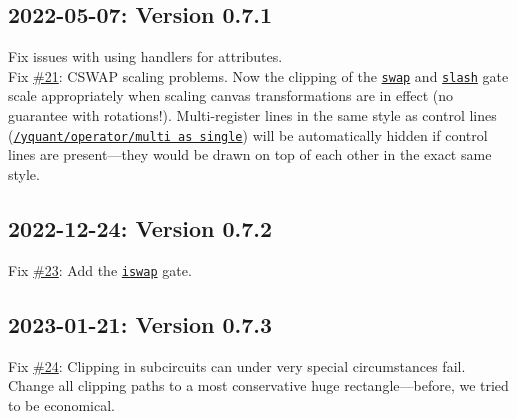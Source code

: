\documentclass{scrartcl}
\def\gate#1{\hyperref[gate:#1]{\texttt{#1}}}
\def\style#1{\hyperref[style:#1]{\texttt{#1}}}
\begin{document}
      \subsection*{2022-05-07: Version 0.7.1}
         Fix issues with using handlers for attributes. \\
         Fix \href{https://github.com/projekter/yquant/issues/21}{\#21}: CSWAP scaling problems. Now the clipping of the \gate{swap} and \gate{slash} gate scale appropriately when scaling canvas transformations are in effect (no guarantee with rotations!). Multi-register lines in the same style as control lines (\style{/yquant/operator/multi as single}) will be automatically hidden if control lines are present---they would be drawn on top of each other in the exact same style.

      \subsection*{2022-12-24: Version 0.7.2}
         Fix \href{https://github.com/projekter/yquant/issues/23}{\#23}: Add the \gate{iswap} gate.

      \subsection*{2023-01-21: Version 0.7.3}
         Fix \href{https://github.com/projekter/yquant/issues/24}{\#24}: Clipping in subcircuits can under very special circumstances fail. Change all clipping paths to a most conservative huge rectangle---before, we tried to be economical.
\end{document}

